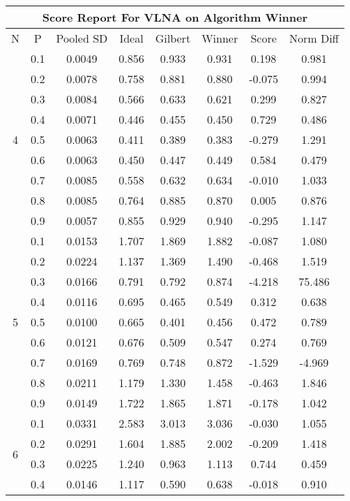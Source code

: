 \documentclass[11pt,a4paper]{report}
\begin{document}
\begin{longtable}{ | c | c || c | c | c | c | c | c | }
\hline
\multicolumn{8}{|c|}{ Score Report For VLNA on Algorithm Winner} \\
\hline
N & P & Pooled SD &  Ideal &  Gilbert & Winner  & Score & Norm Diff \\
 \hline
 \hline
 \endhead
\multirow{9}{*}{4} & 0.1 & 0.0049 & 0.856 & 0.933 & 0.931 & 0.198 & 0.981 \\
 & 0.2 & 0.0078 & 0.758 & 0.881 & 0.880 & -0.075 & 0.994 \\
 & 0.3 & 0.0084 & 0.566 & 0.633 & 0.621 & 0.299 & 0.827 \\
 & 0.4 & 0.0071 & 0.446 & 0.455 & 0.450 & 0.729 & 0.486 \\
 & 0.5 & 0.0063 & 0.411 & 0.389 & 0.383 & -0.279 & 1.291 \\
 & 0.6 & 0.0063 & 0.450 & 0.447 & 0.449 & 0.584 & 0.479 \\
 & 0.7 & 0.0085 & 0.558 & 0.632 & 0.634 & -0.010 & 1.033 \\
 & 0.8 & 0.0085 & 0.764 & 0.885 & 0.870 & 0.005 & 0.876 \\
 & 0.9 & 0.0057 & 0.855 & 0.929 & 0.940 & -0.295 & 1.147 \\
 \hline
\multirow{9}{*}{5} & 0.1 & 0.0153 & 1.707 & 1.869 & 1.882 & -0.087 & 1.080 \\
 & 0.2 & 0.0224 & 1.137 & 1.369 & 1.490 & -0.468 & 1.519 \\
 & 0.3 & 0.0166 & 0.791 & 0.792 & 0.874 & -4.218 & 75.486 \\
 & 0.4 & 0.0116 & 0.695 & 0.465 & 0.549 & 0.312 & 0.638 \\
 & 0.5 & 0.0100 & 0.665 & 0.401 & 0.456 & 0.472 & 0.789 \\
 & 0.6 & 0.0121 & 0.676 & 0.509 & 0.547 & 0.274 & 0.769 \\
 & 0.7 & 0.0169 & 0.769 & 0.748 & 0.872 & -1.529 & -4.969 \\
 & 0.8 & 0.0211 & 1.179 & 1.330 & 1.458 & -0.463 & 1.846 \\
 & 0.9 & 0.0149 & 1.722 & 1.865 & 1.871 & -0.178 & 1.042 \\
 \hline
\multirow{9}{*}{6} & 0.1 & 0.0331 & 2.583 & 3.013 & 3.036 & -0.030 & 1.055 \\
 & 0.2 & 0.0291 & 1.604 & 1.885 & 2.002 & -0.209 & 1.418 \\
 & 0.3 & 0.0225 & 1.240 & 0.963 & 1.113 & 0.744 & 0.459 \\
 & 0.4 & 0.0146 & 1.117 & 0.590 & 0.638 & -0.018 & 0.910 \\

\end{longtable}
\end{document}
